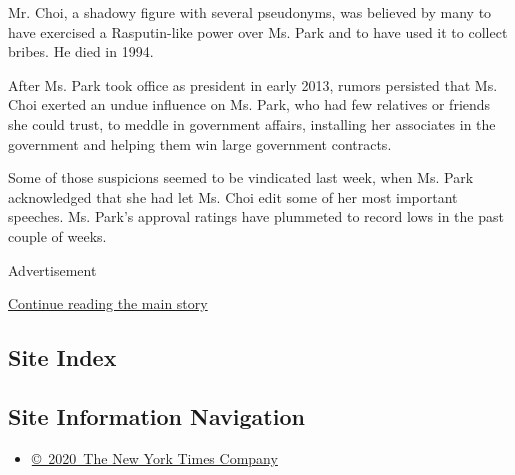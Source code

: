 Mr. Choi, a shadowy figure with several pseudonyms, was believed by many
to have exercised a Rasputin-like power over Ms. Park and to have used
it to collect bribes. He died in 1994.

After Ms. Park took office as president in early 2013, rumors persisted
that Ms. Choi exerted an undue influence on Ms. Park, who had few
relatives or friends she could trust, to meddle in government affairs,
installing her associates in the government and helping them win large
government contracts.

Some of those suspicions seemed to be vindicated last week, when Ms.
Park acknowledged that she had let Ms. Choi edit some of her most
important speeches. Ms. Park's approval ratings have plummeted to record
lows in the past couple of weeks.

Advertisement

\protect\hyperlink{after-bottom}{Continue reading the main story}

\hypertarget{site-index}{%
\subsection{Site Index}\label{site-index}}

\hypertarget{site-information-navigation}{%
\subsection{Site Information
Navigation}\label{site-information-navigation}}

\begin{itemize}
\tightlist
\item
  \href{https://help.nytimes.com/hc/en-us/articles/115014792127-Copyright-notice}{©~2020~The
  New York Times Company}
\end{itemize}

